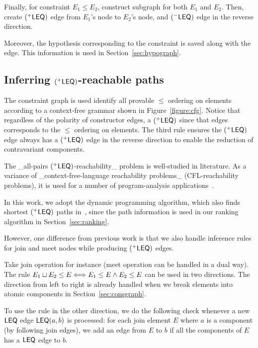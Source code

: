 Finally, for constraint $E_1\leq E_2$, construct subgraph for both
$E_1$ and $E_2$. Then, create $(^{+}\mathsf{LEQ})$ edge from $E_1$'s
node to $E_2$'s node, and $(^{-}\mathsf{LEQ})$ edge in the reverse
direction. 

Moreover, the hypothesis corresponding to the constraint is saved
along with the edge. This information is used in
Section~\ref{sec:hypograph}.

\subsection{Inferring $(^{+}\mathsf{LEQ})$-reachable paths}
\label{sec:leqedge}

The constraint graph is used identify all provable $\leq$ ordering on
elements according to a context-free grammar shown in
Figure~\ref{figure:cfg}. Notice that regardless of the polarity of
constructor edges, a $(^{+}\mathsf{LEQ})$ since that edges
corresponds to the $\leq$ ordering on elements. The third rule ensures
the $(^{+}\mathsf{LEQ})$ edge always has a $(^{+}\mathsf{LEQ})$ edge
in the reverse direction to enable the reduction of contravariant
components.

The _all-pairs $(^{+}\mathsf{LEQ})$-reachability_ problem is
well-studied in literature\cite{melski-cflgraph,barrett-cflpath}. As a
variance of _context-free-language reachability problems_
(CFL-reachability problems), it is used for a number of
program-analysis applications~\cite{reps-graph}. 

In this work, we adopt the dynamic programming algorithm, which also
finds shortest $(^{+}\mathsf{LEQ})$ paths in~\cite{barrett-cflpath},
since the path information is used in our ranking algorithm in
Section~\ref{sec:ranking}.

However, one difference from previous work is that we also handle
inference rules for join and meet nodes while producing
$(^{+}\mathsf{LEQ})$ edges.

Take join operation for instance (meet operation can be handled in a
dual way). The rule $E_1\sqcup E_2\leq E \Longleftrightarrow E_1\leq E \land E_2 \leq
E $ can be used in two directions. The direction from left to right is
already handled when we break elements into atomic components in
Section~\ref{sec:consgraph}.

To use the rule in the other direction, we do the following check
whenever a new $\mathsf{LEQ}$ edge $\mathsf{LEQ}(a,b)$ is processed: for each join
element $E$ where $a$ is a component (by following join edges), we add
an edge from $E$ to $b$ if all the components of $E$ has a $\mathsf{LEQ}$ edge
to $b$. 

